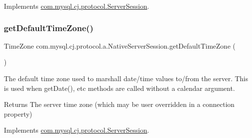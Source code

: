 Implements \mbox{\hyperlink{interfacecom_1_1mysql_1_1cj_1_1protocol_1_1_server_session_a7c64dec4bc0e55be071abce45e3c2ef2}{com.\+mysql.\+cj.\+protocol.\+Server\+Session}}.

\mbox{\label{classcom_1_1mysql_1_1cj_1_1protocol_1_1a_1_1_native_server_session_abba6aad0abd51609f134af9fa2cd345f}} 
\subsubsection{\texorpdfstring{get\+Default\+Time\+Zone()}{getDefaultTimeZone()}}
{\footnotesize\ttfamily Time\+Zone com.\+mysql.\+cj.\+protocol.\+a.\+Native\+Server\+Session.\+get\+Default\+Time\+Zone (\begin{DoxyParamCaption}{ }\end{DoxyParamCaption})}

The default time zone used to marshall date/time values to/from the server. This is used when get\+Date(), etc methods are called without a calendar argument.

\begin{DoxyReturn}{Returns}
The server time zone (which may be user overridden in a connection property) 
\end{DoxyReturn}


Implements \mbox{\hyperlink{interfacecom_1_1mysql_1_1cj_1_1protocol_1_1_server_session_a080efb1043278f9c6d13f7dc24d18476}{com.\+mysql.\+cj.\+protocol.\+Server\+Session}}.

\mbox{\label{classcom_1_1mysql_1_1cj_1_1protocol_1_1a_1_1_native_server_session_a3a9d807f5e66892f234d06934d275de1}} 
